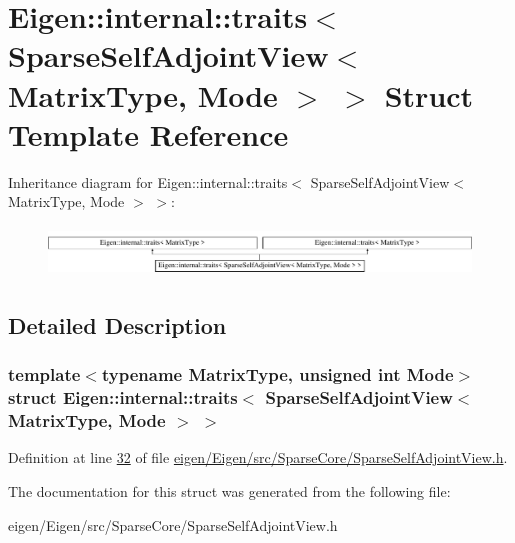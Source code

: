 \hypertarget{struct_eigen_1_1internal_1_1traits_3_01_sparse_self_adjoint_view_3_01_matrix_type_00_01_mode_01_4_01_4}{}\section{Eigen\+:\+:internal\+:\+:traits$<$ Sparse\+Self\+Adjoint\+View$<$ Matrix\+Type, Mode $>$ $>$ Struct Template Reference}
\label{struct_eigen_1_1internal_1_1traits_3_01_sparse_self_adjoint_view_3_01_matrix_type_00_01_mode_01_4_01_4}
Inheritance diagram for Eigen\+:\+:internal\+:\+:traits$<$ Sparse\+Self\+Adjoint\+View$<$ Matrix\+Type, Mode $>$ $>$\+:\begin{figure}[H]
\begin{center}
\leavevmode
\includegraphics[height=1.352657cm]{struct_eigen_1_1internal_1_1traits_3_01_sparse_self_adjoint_view_3_01_matrix_type_00_01_mode_01_4_01_4}
\end{center}
\end{figure}


\subsection{Detailed Description}
\subsubsection*{template$<$typename Matrix\+Type, unsigned int Mode$>$\newline
struct Eigen\+::internal\+::traits$<$ Sparse\+Self\+Adjoint\+View$<$ Matrix\+Type, Mode $>$ $>$}



Definition at line \hyperlink{eigen_2_eigen_2src_2_sparse_core_2_sparse_self_adjoint_view_8h_source_l00032}{32} of file \hyperlink{eigen_2_eigen_2src_2_sparse_core_2_sparse_self_adjoint_view_8h_source}{eigen/\+Eigen/src/\+Sparse\+Core/\+Sparse\+Self\+Adjoint\+View.\+h}.



The documentation for this struct was generated from the following file\+:\begin{DoxyCompactItemize}
\item 
eigen/\+Eigen/src/\+Sparse\+Core/\+Sparse\+Self\+Adjoint\+View.\+h\end{DoxyCompactItemize}
